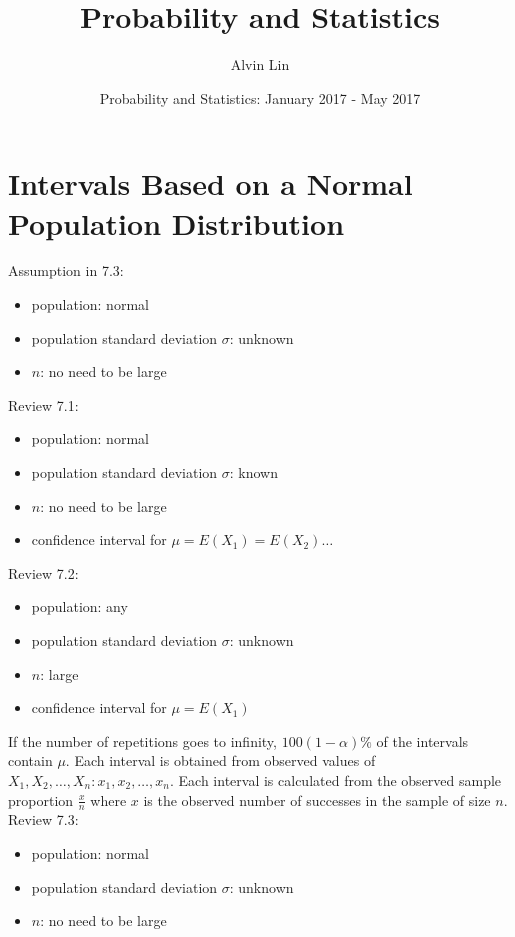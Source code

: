 \documentclass[letterpaper, 12pt]{math}
\title{Probability and Statistics}
\author{Alvin Lin}
\date{Probability and Statistics: January 2017 - May 2017}
\begin{document}
\maketitle

\section*{Intervals Based on a Normal Population Distribution}
Assumption in 7.3:
\begin{itemize}
  \item population: normal
  \item population standard deviation \( \sigma \): unknown
  \item \( n \): no need to be large
\end{itemize}
Review 7.1:
\begin{itemize}
  \item population: normal
  \item population standard deviation \( \sigma \): known
  \item \( n \): no need to be large
  \item confidence interval for \( \mu = E(X_{1}) = E(X_{2})\dots \)
\end{itemize}
Review 7.2:
\begin{itemize}
  \item population: any
  \item population standard deviation \( \sigma \): unknown
  \item \( n \): large
  \item confidence interval for \( \mu = E(X_{1}) \)
\end{itemize}
If the number of repetitions goes to infinity, \( 100(1-\alpha)\% \) of
the intervals contain \( \mu \). Each interval is obtained from observed
values of \( X_{1},X_{2},\dots,X_{n}:x_{1},x_{2},\dots,x_{n} \). Each
interval is calculated from the observed sample proportion \( \frac{x}{n} \)
where \( x \) is the observed number of successes in the sample of size \( n \).
Review 7.3:
\begin{itemize}
  \item population: normal
  \item population standard deviation \( \sigma \): unknown
  \item \( n \): no need to be large
\end{itemize}
\end{document}
